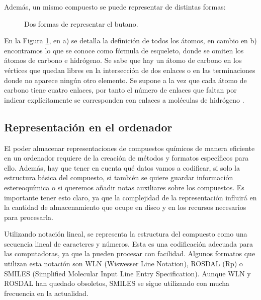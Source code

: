 Además, un mismo compuesto se puede representar de distintas formas:
\begin{figure}[H]
\centering
    \caption{Dos formas de representar el butano. \cite{structrep}}
    \label{fig:butano}
\end{figure}

En la Figura \ref{fig:butano}, en a) se detalla la definición de todos los átomos, en cambio en b) encontramos lo que se conoce como fórmula de esqueleto, donde se omiten los átomos de carbono e hidrógeno. Se sabe que hay un átomo de carbono en los vértices que quedan libres en la intersección de dos enlaces o en las terminaciones donde no aparece ningún otro elemento. Se supone a la vez que cada átomo de carbono tiene cuatro enlaces, por tanto el número de enlaces que faltan por indicar explícitamente se corresponden con enlaces a moléculas de hidrógeno \cite{formestructural,structrep}.


\subsection{Representación en el ordenador}
El poder almacenar representaciones de compuestos químicos de manera eficiente en un ordenador requiere de la creación de métodos y formatos específicos para ello. Además, hay que tener en cuenta qué datos vamos a codificar, si solo la estructura básica del compuesto, si también se quiere guardar información estereoquímica o si queremos añadir notas auxiliares sobre los compuestos. Es importante tener esto claro, ya que la complejidad de la representación influirá en la cantidad de almacenamiento que ocupe en disco y en los recursos necesarios para procesarla.

Utilizando notación lineal, se representa la estructura del compuesto como una secuencia lineal de caracteres y números. Esta es una codificación adecuada para las computadoras, ya que la pueden procesar con facilidad. Algunos formatos que utilizan esta notación son WLN (Wiswesser Line Notation), ROSDAL (Rp) o SMILES (Simplified Molecular Input Line Entry Specification). Aunque WLN y ROSDAL han quedado obsoletos, SMILES se sigue utilizando con mucha frecuencia en la actualidad. \cite{doi:10.1021/ci600234z}

